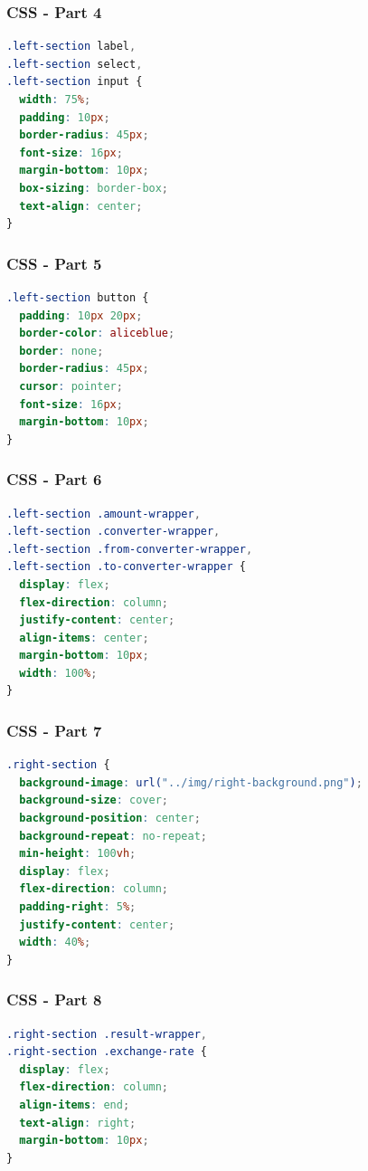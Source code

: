 \documentclass[aspectratio=169, table]{beamer}
\begin{document}
\begin{frame}[fragile]
    \frametitle{CSS - Part 4}
    \begin{lstlisting}[language=CSS]
.left-section label,
.left-section select,
.left-section input {
  width: 75%;
  padding: 10px;
  border-radius: 45px;
  font-size: 16px;
  margin-bottom: 10px;
  box-sizing: border-box;
  text-align: center;
}
    \end{lstlisting}
\end{frame}

\begin{frame}[fragile]
    \frametitle{CSS - Part 5}
    \begin{lstlisting}[language=CSS]
.left-section button {
  padding: 10px 20px;
  border-color: aliceblue;
  border: none;
  border-radius: 45px;
  cursor: pointer;
  font-size: 16px;
  margin-bottom: 10px;
}
    \end{lstlisting}
\end{frame}

\begin{frame}[fragile]
    \frametitle{CSS - Part 6}
    \begin{lstlisting}[language=CSS]
.left-section .amount-wrapper,
.left-section .converter-wrapper,
.left-section .from-converter-wrapper,
.left-section .to-converter-wrapper {
  display: flex;
  flex-direction: column;
  justify-content: center;
  align-items: center;
  margin-bottom: 10px;
  width: 100%;
}
    \end{lstlisting}
\end{frame}

\begin{frame}[fragile]
    \frametitle{CSS - Part 7}
    \begin{lstlisting}[language=CSS]
.right-section {
  background-image: url("../img/right-background.png");
  background-size: cover;
  background-position: center;
  background-repeat: no-repeat;
  min-height: 100vh;
  display: flex;
  flex-direction: column;
  padding-right: 5%;
  justify-content: center;
  width: 40%;
}
    \end{lstlisting}
\end{frame}

\begin{frame}[fragile]
    \frametitle{CSS - Part 8}
    \begin{lstlisting}[language=CSS]
.right-section .result-wrapper,
.right-section .exchange-rate {
  display: flex;
  flex-direction: column;
  align-items: end;
  text-align: right;
  margin-bottom: 10px;
}
    \end{lstlisting}
\end{frame}
\end{document}
